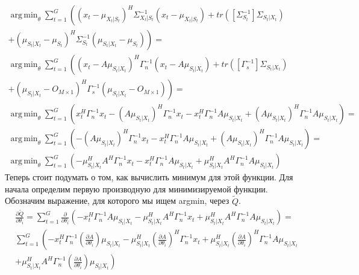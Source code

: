\documentclass[11pt]{article}
\DeclareMathOperator*{\argmin}{arg\,min}
\begin{document}
\begin{equation}
\begin{gathered}
\argmin_{\theta}  \sum_{t=1}^G \left((x_t-\mu_{X_t|S_t})^H\Sigma_{X_t|S_t}^{-1}(x_t-\mu_{X_t|S_t}) +  tr([\Sigma_{S_t}^{-1}]\Sigma_{S_t|X_t}) \right. \\ \left. +  (\mu_{S_t|X_t}-\mu_{S_t})^H\Sigma_{S_t}^{-1}(\mu_{S_t|X_t}-\mu_{S_t})\right) = \\
\argmin_{\theta}  \sum_{t=1}^G \left((x_t-A\mu_{S_t|X_t})^H\Gamma_n^{-1}(x_t-A\mu_{S_t|X_t}) +  tr([\Gamma_s^{-1}]\Sigma_{S_t|X_t}) \right. \\ \left. +  (\mu_{S_t|X_t}-O_{M \times 1})^H\Gamma_s^{-1}(\mu_{S_t|X_t}-O_{M \times 1})\right) = \\
\argmin_{\theta}  \sum_{t=1}^G \left(x_t^H\Gamma_n^{-1}x_t -(A\mu_{S_t|X_t})^H\Gamma_n^{-1}x_t -x_t^H\Gamma_n^{-1}A\mu_{S_t|X_t} + (A\mu_{S_t|X_t})^H\Gamma_n^{-1}A\mu_{S_t|X_t} \right) =\\
\argmin_{\theta}  \sum_{t=1}^G \left(-(A\mu_{S_t|X_t})^H\Gamma_n^{-1}x_t -x_t^H\Gamma_n^{-1}A\mu_{S_t|X_t} + (A\mu_{S_t|X_t})^H\Gamma_n^{-1}A\mu_{S_t|X_t} \right) =\\
\argmin_{\theta}  \sum_{t=1}^G \left(-\mu_{S_t|X_t}^HA^H\Gamma_n^{-1}x_t -x_t^H\Gamma_n^{-1}A\mu_{S_t|X_t} + \mu_{S_t|X_t}^HA^H\Gamma_n^{-1}A\mu_{S_t|X_t} \right)
\end{gathered}
\end{equation}
Теперь стоит подумать о том, как вычислить минимум для этой функции. Для начала определим первую производную для минимизируемой функции.
Обозначим выражение, для которого мы ищем argmin, через $\tilde{Q}$. 
\begin{equation}
\begin{gathered}
\frac{\partial \tilde{Q}}{\partial \theta_i} = 
\sum_{t=1}^G \frac{\partial}{\partial \theta_i} \left(-x_t^H\Gamma_n^{-1}A\mu_{S_t|X_t}-\mu_{S_t|X_t}^HA^H\Gamma_n^{-1}x_t  + \mu_{S_t|X_t}^HA^H\Gamma_n^{-1}A\mu_{S_t|X_t} \right) = \\
\sum_{t=1}^G \left(-x_t^H\Gamma_n^{-1}\left(\frac{\partial A}{\partial \theta_i}\right)\mu_{S_t|X_t}-\mu_{S_t|X_t}^H\left(\frac{\partial A}{\partial \theta_i}\right)^H\Gamma_n^{-1}x_t  + \mu_{S_t|X_t}^H\left(\frac{\partial A}{\partial \theta_i}\right)^H\Gamma_n^{-1}A\mu_{S_t|X_t}  \right. \\
+ \left. \mu_{S_t|X_t}^HA^H\Gamma_n^{-1}\left(\frac{\partial A}{\partial \theta_i}\right)\mu_{S_t|X_t} \right) 
\end{gathered}
\end{equation}
\end{document}
